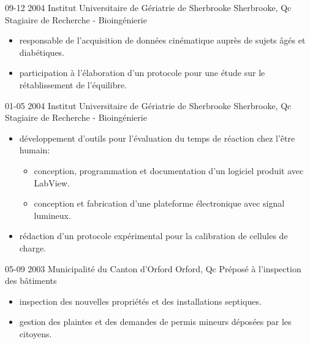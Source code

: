 \documentclass[]{friggos-cv} %
\begin{document}
\begin{entrylist}
  \entryBul
    {09-12 2004}
    {Institut Universitaire de Gériatrie de Sherbrooke}
    {Sherbrooke, Qc}
    {Stagiaire de Recherche - Bioingénierie}
    {
     \begin{itemize}[leftmargin=*]
       \setlength\itemsep{0pt}
       \item responsable de l'acquisition de données cinématique auprès de sujets âgés et diabétiques.
       \item participation à l'élaboration d'un protocole pour une étude sur le rétablissement de l'équilibre.
     \end{itemize}
     }
\end{entrylist}
\begin{entrylist}
  \entryBul
    {01-05 2004}
    {Institut Universitaire de Gériatrie de Sherbrooke}
    {Sherbrooke, Qc}
    {Stagiaire de Recherche - Bioingénierie}
    {
     \begin{itemize}[leftmargin=*]
       \setlength\itemsep{0pt}       
       \item développement d'outils pour l'évaluation du temps de réaction chez l'être humain:
         \begin{itemize}
           \item conception, programmation et documentation d'un logiciel produit avec LabView.
           \item conception et fabrication d'une plateforme électronique avec signal lumineux.
         \end{itemize}
       \item rédaction d'un protocole expérimental pour la calibration de cellules de charge.
     \end{itemize}
     }
\end{entrylist}
\begin{entrylist}
  \entryBul
    {05-09 2003}
    {Municipalité du Canton d'Orford}
    {Orford, Qc}
    {Préposé à l'inspection des bâtiments}
    {
     \begin{itemize}[leftmargin=*]
       \setlength\itemsep{0pt}  
       \item inspection des nouvelles propriétés et des installations septiques.
       \item gestion des plaintes et des demandes de permis mineurs déposées par les citoyens.
     \end{itemize}
    }
\end{entrylist}
\end{document}
